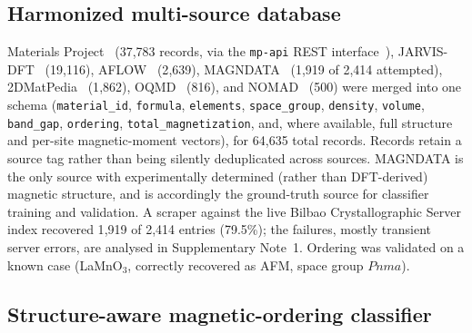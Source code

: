\documentclass[aps,prb,preprint,superscriptaddress,longbibliography,nofootinbib]{revtex4-2}
\begin{document}
\subsection*{Harmonized multi-source database}

Materials Project~\cite{jain2013} (37{,}783 records, via the \texttt{mp-api} REST
interface~\cite{ong2015}), JARVIS-DFT~\cite{choudhary2020} (19{,}116), AFLOW~\cite{curtarolo2012} (2{,}639),
MAGNDATA~\cite{gallego2016a,gallego2016b} (1{,}919 of 2{,}414 attempted), 2DMatPedia~\cite{zhou2019}
(1{,}862), OQMD~\cite{saal2013,kirklin2015} (816), and NOMAD~\cite{draxl2018} (500) were merged into one
schema (\texttt{material\_id}, \texttt{formula}, \texttt{elements}, \texttt{space\_group}, \texttt{density},
\texttt{volume}, \texttt{band\_gap}, \texttt{ordering}, \texttt{total\_magnetization}, and, where available,
full structure and per-site magnetic-moment vectors), for 64{,}635 total records. Records retain a source tag
rather than being silently deduplicated across sources. MAGNDATA is the only source with experimentally
determined (rather than DFT-derived) magnetic structure, and is accordingly the ground-truth source for
classifier training and validation. A scraper against the live Bilbao Crystallographic Server index recovered 1{,}919 of 2{,}414 entries
(79.5\%); the failures, mostly transient server errors, are analysed in Supplementary Note~1.
Ordering was validated on a known case (LaMnO$_3$, correctly recovered as AFM, space group $Pnma$).

\subsection*{Structure-aware magnetic-ordering classifier}
\end{document}
